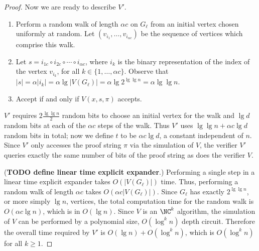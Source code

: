 \documentclass[]{article}
\begin{document}
\begin{proof}
  Now we are ready to describe $V'$.
  \begin{enumerate}
  \item
    Perform a random walk of length $\alpha c$ on $G_\ell$ from an initial vertex chosen uniformly at random.
    Let $(v_{i_1}, \dotsc, v_{i_{\alpha c}})$ be the sequence of vertices which comprise this walk.
  \item
    Let $s = i_{1c} \circ i_{2c} \circ \dotsb \circ i_{\alpha c}$, where $i_k$ is the binary representation of the index of the vertex $v_{i_k}$, for all $k \in \{1, \dotsc, \alpha c\}$.
    Observe that $|s| = \alpha |i_k| = \alpha \lg |V(G_\ell)| = \alpha \lg 2^{\lg \lg n} = \alpha \lg \lg n$.
  \item Accept if and only if $V(x, s, \pi)$ accepts.
  \end{enumerate}
  $V'$ requires $2 \frac{\lg \lg n}{2}$ random bits to choose an initial vertex for the walk and $\lg d$ random bits at each of the $\alpha c$ steps of the walk.
  Thus $V'$ uses $\lg \lg n + \alpha c \lg d$ random bits in total; now we define $t$ to be $\alpha c \lg d$, a constant independent of $n$.
  Since $V'$ only accesses the proof string $\pi$ via the simulation of $V$, the verifier $V'$ queries exactly the same number of bits of the proof string as does the verifier $V$.

  (\textbf{TODO define linear time explicit expander}.)
  Performing a single step in a linear time explicit expander takes $O(|V(G_\ell)|)$ time.
  Thus, performing a random walk of length $\alpha c$ takes $O(\alpha c |V(G_\ell)|)$.
  Since $G_\ell$ has exactly $2^{\lg \lg n}$, or more simply $\lg n$, vertices, the total computation time for the random walk is $O(\alpha c \lg n)$, which is in $O(\lg n)$.
  Since $V$ is an $\NC^k$ algorithm, the simulation of $V$ can be performed by a polynomial size, $O(\log^k n)$ depth circuit.
  Therefore the overall time required by $V'$ is $O(\lg n) + O(\log^k n)$, which is $O(\log^k n)$ for all $k \geq 1$.


\end{proof}
\end{document}
